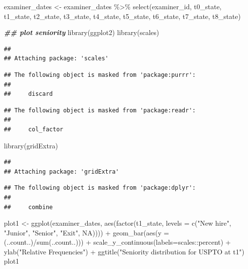 \documentclass[
]{article}
\newenvironment{Shaded}{\begin{snugshade}}{\end{snugshade}}
\newcommand{\AttributeTok}[1]{\textcolor[rgb]{0.77,0.63,0.00}{#1}}
\newcommand{\ConstantTok}[1]{\textcolor[rgb]{0.00,0.00,0.00}{#1}}
\newcommand{\DocumentationTok}[1]{\textcolor[rgb]{0.56,0.35,0.01}{\textbf{\textit{#1}}}}
\newcommand{\FunctionTok}[1]{\textcolor[rgb]{0.00,0.00,0.00}{#1}}
\newcommand{\NormalTok}[1]{#1}
\newcommand{\OtherTok}[1]{\textcolor[rgb]{0.56,0.35,0.01}{#1}}
\newcommand{\SpecialCharTok}[1]{\textcolor[rgb]{0.00,0.00,0.00}{#1}}
\newcommand{\StringTok}[1]{\textcolor[rgb]{0.31,0.60,0.02}{#1}}
\begin{document}
\begin{Shaded}
\begin{Highlighting}[]
\NormalTok{examiner\_dates }\OtherTok{\textless{}{-}}\NormalTok{ examiner\_dates }\SpecialCharTok{\%\textgreater{}\%} 
  \FunctionTok{select}\NormalTok{(examiner\_id, t0\_state, t1\_state, t2\_state, t3\_state, t4\_state, t5\_state, t6\_state, t7\_state, t8\_state)}

\DocumentationTok{\#\# plot seniority}
\FunctionTok{library}\NormalTok{(ggplot2)}
\FunctionTok{library}\NormalTok{(scales)  }
\end{Highlighting}
\end{Shaded}

\begin{verbatim}
## 
## Attaching package: 'scales'
\end{verbatim}

\begin{verbatim}
## The following object is masked from 'package:purrr':
## 
##     discard
\end{verbatim}

\begin{verbatim}
## The following object is masked from 'package:readr':
## 
##     col_factor
\end{verbatim}

\begin{Shaded}
\begin{Highlighting}[]
\FunctionTok{library}\NormalTok{(gridExtra)}
\end{Highlighting}
\end{Shaded}

\begin{verbatim}
## 
## Attaching package: 'gridExtra'
\end{verbatim}

\begin{verbatim}
## The following object is masked from 'package:dplyr':
## 
##     combine
\end{verbatim}

\begin{Shaded}
\begin{Highlighting}[]
\NormalTok{plot1 }\OtherTok{\textless{}{-}} \FunctionTok{ggplot}\NormalTok{(examiner\_dates, }\FunctionTok{aes}\NormalTok{(}\FunctionTok{factor}\NormalTok{(t1\_state, }\AttributeTok{levels =} \FunctionTok{c}\NormalTok{(}\StringTok{"New hire"}\NormalTok{, }\StringTok{"Junior"}\NormalTok{, }\StringTok{"Senior"}\NormalTok{, }\StringTok{"Exit"}\NormalTok{, }\ConstantTok{NA}\NormalTok{)))) }\SpecialCharTok{+} 
          \FunctionTok{geom\_bar}\NormalTok{(}\FunctionTok{aes}\NormalTok{(}\AttributeTok{y =}\NormalTok{ (..count..)}\SpecialCharTok{/}\FunctionTok{sum}\NormalTok{(..count..))) }\SpecialCharTok{+} 
          \FunctionTok{scale\_y\_continuous}\NormalTok{(}\AttributeTok{labels=}\NormalTok{scales}\SpecialCharTok{::}\NormalTok{percent) }\SpecialCharTok{+}
          \FunctionTok{ylab}\NormalTok{(}\StringTok{"Relative Frequencies"}\NormalTok{) }\SpecialCharTok{+}
          \FunctionTok{ggtitle}\NormalTok{(}\StringTok{"Seniority distribution for USPTO at t1"}\NormalTok{)}
\NormalTok{plot1}
\end{Highlighting}
\end{Shaded}
\end{document}
